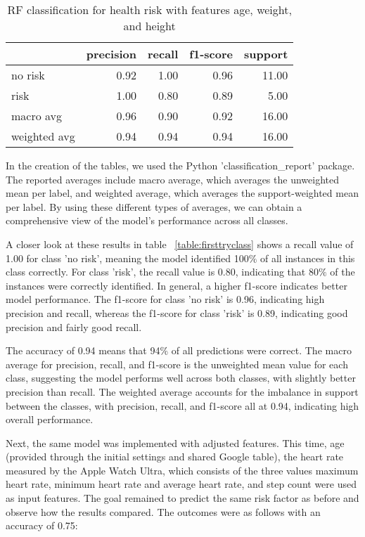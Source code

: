 \begin{table}[H]
\centering
\begin{tabular}{lrrrr}
\toprule
{} & precision & recall & f1-score & support \\
\midrule
no risk & 0.92 & 1.00 & 0.96 & 11.00 \\
risk & 1.00 & 0.80 & 0.89 & 5.00 \\
macro avg & 0.96 & 0.90 & 0.92 & 16.00 \\
weighted avg & 0.94 & 0.94 & 0.94 & 16.00 \\
\bottomrule
\end{tabular}
\caption{RF classification for health risk with features age, weight, and height}
\label{table:sectryclass}
\end{table}

In the creation of the tables, we used the Python 'classification\_report' package. The reported averages include macro average, which averages the unweighted mean per label, and weighted average, which averages the support-weighted mean per label. By using these different types of averages, we can obtain a comprehensive view of the model's performance across all classes.

A closer look at these results in table ~\ref{table:firsttryclass} shows a recall value of 1.00 for class 'no risk', meaning the model identified 100$\%$ of all instances in this class correctly. For class 'risk', the recall value is 0.80, indicating that 80$\%$ of the instances were correctly identified. In general, a higher f1-score indicates better model performance. The f1-score for class 'no risk' is 0.96, indicating high precision and recall, whereas the f1-score for class 'risk' is 0.89, indicating good precision and fairly good recall.

The accuracy of 0.94 means that 94$\%$ of all predictions were correct. The macro average for precision, recall, and f1-score is the unweighted mean value for each class, suggesting the model performs well across both classes, with slightly better precision than recall. The weighted average accounts for the imbalance in support between the classes, with precision, recall, and f1-score all at 0.94, indicating high overall performance.

Next, the same model was implemented with adjusted features. This time, age (provided through the initial settings and shared Google table), the heart rate measured by the Apple Watch Ultra, which consists of the three values maximum heart rate, minimum heart rate and average heart rate, and step count were used as input features. The goal remained to predict the same risk factor as before and observe how the results compared. The outcomes were as follows with an accuracy of 0.75:

